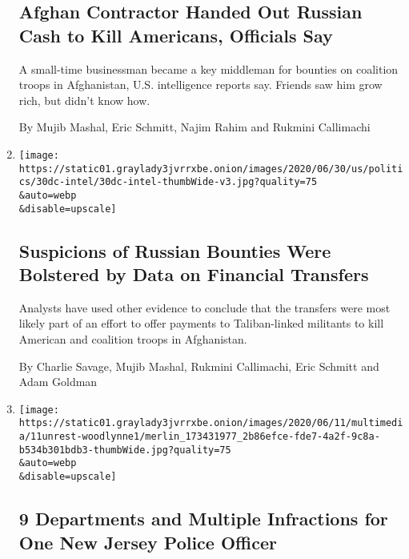 \begin{enumerate}
  \hypertarget{afghan-contractor-handed-out-russian-cash-to-kill-americans-officials-say}{%
  \subsection{Afghan Contractor Handed Out Russian Cash to Kill
  Americans, Officials
  Say}\label{afghan-contractor-handed-out-russian-cash-to-kill-americans-officials-say}}

  A small-time businessman became a key middleman for bounties on
  coalition troops in Afghanistan, U.S. intelligence reports say.
  Friends saw him grow rich, but didn't know how.

  By Mujib Mashal, Eric Schmitt, Najim Rahim and Rukmini Callimachi
\item
  \href{/2020/06/30/us/politics/russian-bounties-afghanistan-intelligence.html}{}

  \texttt{[image: https://static01.graylady3jvrrxbe.onion/images/2020/06/30/us/politics/30dc-intel/30dc-intel-thumbWide-v3.jpg?quality=75\\\&auto=webp\\\&disable=upscale]}

  \hypertarget{suspicions-of-russian-bounties-were-bolstered-by-data-on-financial-transfers}{%
  \subsection{Suspicions of Russian Bounties Were Bolstered by Data on
  Financial
  Transfers}\label{suspicions-of-russian-bounties-were-bolstered-by-data-on-financial-transfers}}

  Analysts have used other evidence to conclude that the transfers were
  most likely part of an effort to offer payments to Taliban-linked
  militants to kill American and coalition troops in Afghanistan.

  By Charlie Savage, Mujib Mashal, Rukmini Callimachi, Eric Schmitt and
  Adam Goldman
\item
  \href{/2020/06/24/nyregion/new-jersey-police.html}{}

  \texttt{[image: https://static01.graylady3jvrrxbe.onion/images/2020/06/11/multimedia/11unrest-woodlynne1/merlin\_173431977\_2b86efce-fde7-4a2f-9c8a-b534b301bdb3-thumbWide.jpg?quality=75\\\&auto=webp\\\&disable=upscale]}

  \hypertarget{9-departments-and-multiple-infractions-for-one-new-jersey-police-officer}{%
  \subsection{9 Departments and Multiple Infractions for One New Jersey
  Police
  Officer}\label{9-departments-and-multiple-infractions-for-one-new-jersey-police-officer}}


\end{enumerate}

